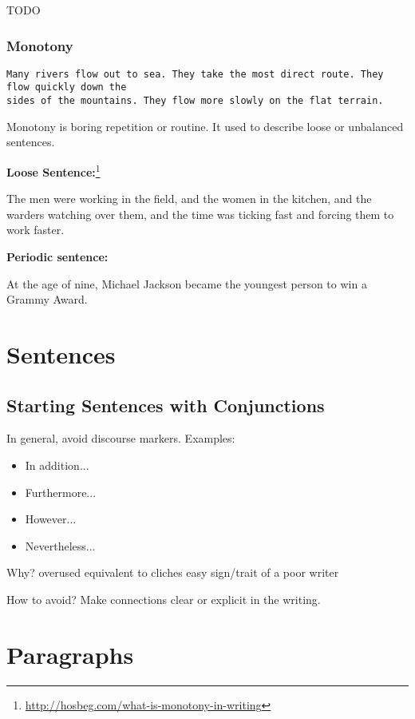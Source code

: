 \documentclass[10pt,a4paper]{book}
\begin{document}
\color{BrickRed}TODO\color{black}


\subsection{Monotony}

\begin{verbatim}
Many rivers flow out to sea. They take the most direct route. They flow quickly down the
sides of the mountains. They flow more slowly on the flat terrain.
\end{verbatim}

Monotony is boring repetition or routine. It used to describe loose or unbalanced sentences.

\textbf{Loose Sentence:}\footnote{\url{http://hosbeg.com/what-is-monotony-in-writing}}

The men were working in the field, and the women in the kitchen, and the warders watching over them, and the time was ticking fast and forcing them to work faster.

\textbf{Periodic sentence:}

At the age of nine, Michael Jackson became the youngest person to win a Grammy Award.


\chapter{Sentences}

\section{Starting Sentences with Conjunctions}

In general, avoid discourse markers. Examples:
\begin{itemize}
    \itemsep1pt\parskip0pt
    \item In addition...
    \item Furthermore...
    \item However...
    \item Nevertheless...
\end{itemize}

Why?
overused
equivalent to cliches
easy sign/trait of a poor writer

How to avoid?
Make connections clear or explicit in the writing.


\chapter{Paragraphs}
\end{document}
